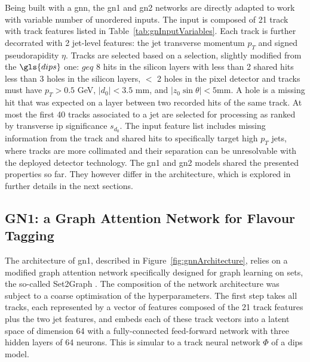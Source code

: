 Being built with a \gls{gnn}, the \gls{gn1} and \gls{gn2} networks are directly adapted to work with variable number of unordered inputs. The input is composed of 21 track with track features listed in Table~\ref{tab:gnInputVariables}. Each track is further decorrated with 2 jet-level features: the jet transverse momentum $p_T$ and signed pseudorapidity $\eta$. Tracks are selected based on a selection, slightly modified from the $\gls{dips}$ one: $geq$ 8 hits in the silicon layers with less than 2 shared hits less than 3 holes in the silicon layers, $<$ 2 holes in the pixel detector and tracks must have $p_T > 0.5$ GeV, $|d_0| < 3.5$ mm, and $|z_0 \sin\theta| < 5$mm. A hole is a missing hit that was expected on a layer between two recorded hits of the same track. At most the first 40 tracks associated to a jet are selected for processing as ranked by transverse \gls{ip} significance $s_{d_0}$. The input feature list includes missing information from the track and shared hits to specifically target high $p_T$ jets, where tracks are more collimated and their separation can be unresolvable with the deployed detector technology. The \gls{gn1} and \gls{gn2} models shared the presented properties so far. They however differ in the architecture, which is explored in further details in the next sections. \\

\subsection{GN1: a Graph Attention Network for Flavour Tagging}\label{chap-GN1}
The architecture of \gls{gn1}, described in Figure~\ref{fig:gnnArchitecture}, relies on a modified graph attention network \cite{brody2022how} specifically designed for graph learning on sets, the so-called Set2Graph \cite{serviansky2020set2graph}. The composition of the network architecture was subject to a coarse optimisation of the hyperparameters. The first step takes all tracks, each represented by a vector of features composed of the 21 track features plus the two jet features, and embeds each of these track vectors into a latent space of dimension 64 with a fully-connected feed-forward network with three hidden layers of 64 neurons. This is simular to a track neural network $\Phi$ of a \gls{dips} model. \\

